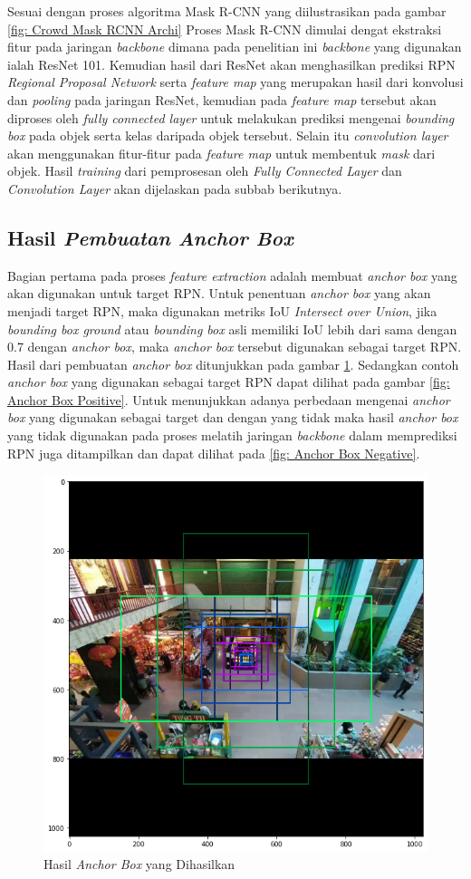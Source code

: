 Sesuai dengan proses algoritma Mask R-CNN yang diilustrasikan pada gambar \ref{fig: Crowd Mask RCNN Archi}
Proses Mask R-CNN dimulai dengat ekstraksi fitur pada jaringan \textit{backbone} dimana pada penelitian ini
\textit{backbone} yang digunakan ialah ResNet 101. Kemudian hasil dari ResNet akan menghasilkan prediksi
RPN \textit{Regional Proposal Network} serta \textit{feature map} yang merupakan hasil dari konvolusi dan
\textit{pooling} pada jaringan ResNet, kemudian pada \textit{feature map} tersebut akan diproses oleh
\textit{fully connected layer} untuk melakukan prediksi mengenai \textit{bounding box} pada objek serta
kelas daripada objek tersebut. Selain itu \textit{convolution layer} akan menggunakan fitur-fitur pada 
\textit{feature map} untuk membentuk \textit{mask} dari objek. Hasil \textit{training} dari pemprosesan
oleh \textit{Fully Connected Layer} dan \textit{Convolution Layer} akan dijelaskan pada subbab berikutnya.

\subsection{Hasil \textit{Pembuatan Anchor Box}}
Bagian pertama pada proses \textit{feature extraction} adalah membuat \textit{anchor box} yang akan digunakan
untuk target RPN. Untuk penentuan \textit{anchor box} yang akan menjadi target RPN, maka digunakan metriks IoU
\textit{Intersect over Union}, jika \textit{bounding box ground} atau \textit{bounding box} asli memiliki IoU lebih
dari sama dengan 0.7 dengan \textit{anchor box}, maka \textit{anchor box} tersebut digunakan sebagai target RPN.
Hasil dari pembuatan \textit{anchor box} ditunjukkan pada gambar \ref{fig: Anchor Box}. Sedangkan contoh 
\textit{anchor box} yang digunakan sebagai target RPN dapat dilihat pada gambar \ref{fig: Anchor Box Positive}.
Untuk menunjukkan adanya perbedaan mengenai \textit{anchor box} yang digunakan sebagai target dan dengan
yang tidak maka hasil \textit{anchor box} yang tidak digunakan pada proses melatih jaringan \textit{backbone} dalam
memprediksi RPN juga ditampilkan dan dapat dilihat pada \ref{fig: Anchor Box Negative}.

\begin{figure}[h!]
  \begin{center}
    \includegraphics[width= 0.55\linewidth]{bab4/Anchor Box.png}
    \caption{Hasil \textit{Anchor Box} yang Dihasilkan}
    \label{fig: Anchor Box}
  \end{center}
\end{figure}

